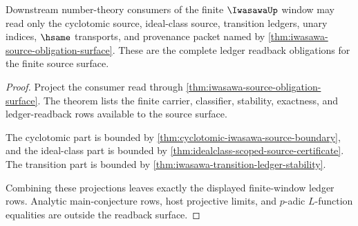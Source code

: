\begin{theorem}
\label{thm:iwasawa-ledger-readback-obligations}
Downstream number-theory consumers of the finite $\IwasawaUp$ window may read
only the cyclotomic source, ideal-class source, transition ledgers, unary
indices, $\hsame$ transports, and provenance packet named by
\autoref{thm:iwasawa-source-obligation-surface}. These are the complete ledger
readback obligations for the finite source surface.
\end{theorem}
\begin{proof}
Project the consumer read through
\autoref{thm:iwasawa-source-obligation-surface}. The theorem lists the finite
carrier, classifier, stability, exactness, and ledger-readback rows available
to the source surface.

The cyclotomic part is bounded by
\autoref{thm:cyclotomic-iwasawa-source-boundary}, and the ideal-class part is
bounded by \autoref{thm:idealclass-scoped-source-certificate}. The transition
part is bounded by \autoref{thm:iwasawa-transition-ledger-stability}.

Combining these projections leaves exactly the displayed finite-window
ledger rows. Analytic main-conjecture rows, host projective limits, and
$p$-adic $L$-function equalities are outside the readback surface.
\end{proof}

